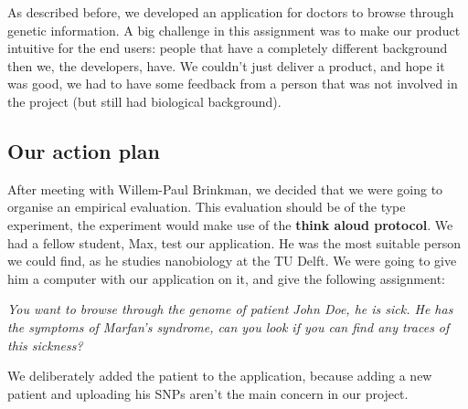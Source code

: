 As described before, we developed an application for doctors to browse through genetic information. A big challenge in this assignment was to make our product intuitive for the end users: people that have a completely different background then we, the developers, have. We couldn't just deliver a product, and hope it was good, we had to have some feedback from a person that was not involved in the project (but still had biological background). 
\subsection{Our action plan}
After meeting with Willem-Paul Brinkman, we decided that we were going to organise an empirical evaluation. This evaluation should be of the type experiment, the experiment would make use of the \textbf{think aloud protocol}. We had a fellow student, Max, test our application. He was the most suitable person we could find, as he studies nanobiology at the TU Delft. We were going to give him a computer with our application on it, and give the following assignment:\\
\begin{addmargin}[2em]{2em}
\textit{You want to browse through the genome of patient John Doe, he is sick. He has the symptoms of Marfan's syndrome, can you look if you can find any traces of this sickness?\\ }
\end{addmargin} 
We deliberately added the patient to the application, because adding a new patient and uploading his SNPs aren't the main concern in our project.
